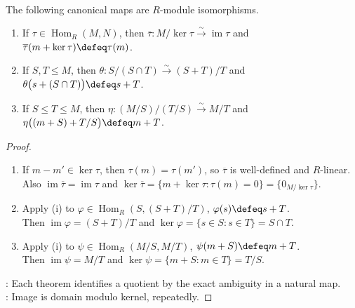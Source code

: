 \begin{theorem} \label{thm:module-isomorphism-theorems} \\
The following canonical maps are $R$-module isomorphisms.
\begin{enumerate}[label=(\roman*)]
\setlength{\itemsep}{0pt}
\item If $\tau\in\operatorname{Hom}_R(M,N)$, then $\overline{\tau}:M/\ker\tau\xrightarrow{\sim}\operatorname{im}\tau$ and $\overline{\tau}(m+\ker\tau)\defeq\tau(m)$.
\item If $S,T\leq M$, then $\theta:S/(S\cap T)\xrightarrow{\sim}(S+T)/T$ and $\theta\bigl(s+(S\cap T)\bigr)\defeq s+T$.
\item If $S\leq T\leq M$, then $\eta:(M/S)/(T/S)\xrightarrow{\sim}M/T$ and $\eta\bigl((m+S)+T/S\bigr)\defeq m+T$.
\end{enumerate}
\begin{proof}
\begin{enumerate}[label=(\roman*)]
\setlength{\itemsep}{0pt}
\item If $m-m'\in\ker\tau$, then $\tau(m)=\tau(m')$, so $\overline{\tau}$ is well-defined and $R$-linear.\\
Also $\operatorname{im}\overline{\tau}=\operatorname{im}\tau$ and $\ker\overline{\tau}=\{m+\ker\tau:\tau(m)=0\}=\{0_{M/\ker\tau}\}$.
\item Apply (i) to $\varphi\in\operatorname{Hom}_R(S,(S+T)/T)$, $\varphi(s)\defeq s+T$.\\
Then $\operatorname{im}\varphi=(S+T)/T$ and $\ker\varphi=\{s\in S:s\in T\}=S\cap T$.
\item Apply (i) to $\psi\in\operatorname{Hom}_R(M/S,M/T)$, $\psi(m+S)\defeq m+T$.\\
Then $\operatorname{im}\psi=M/T$ and $\ker\psi=\{m+S:m\in T\}=T/S$.
\end{enumerate}
: Each theorem identifies a quotient by the exact ambiguity in a natural map.\\
: Image is domain modulo kernel, repeatedly.
\end{proof}
\end{theorem}

